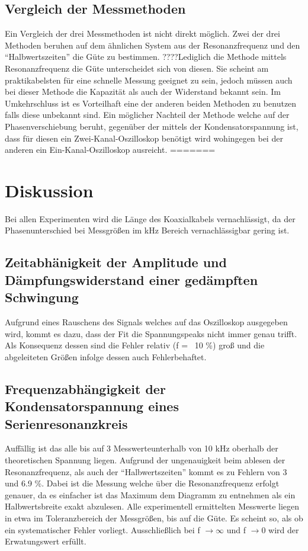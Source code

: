 \subsection{Vergleich der Messmethoden}
Ein Vergleich der drei Messmethoden ist nicht direkt möglich. Zwei der drei Methoden beruhen auf dem ähnlichen System aus der Resonanzfrequenz und den ``Halbwertszeiten'' die Güte zu bestimmen. ????Lediglich die Methode mittels Resonanzfrequenz die Güte unterscheidet sich von diesen. Sie scheint am praktikabelsten für eine schnelle Messung geeignet zu sein, jedoch müssen auch bei dieser Methode die Kapazität als auch der Widerstand bekannt sein. Im Umkehrschluss ist es Vorteilhaft eine der anderen beiden Methoden zu benutzen falls diese unbekannt sind. Ein möglicher Nachteil der Methode welche auf der Phasenverschiebung beruht, gegenüber der mittels der Kondensatorspannung ist, dass für diesen ein Zwei-Kanal-Oszilloskop benötigt wird wohingegen bei der anderen ein Ein-Kanal-Oszilloskop ausreicht.
=======
\section{Diskussion}
\label{sec:Diskussion}
Bei allen Experimenten wird die Länge des Koaxialkabels vernachlässigt, da der Phasenunterschied bei Messgrößen im kHz Bereich vernachlässigbar gering ist.
\subsection{Zeitabhänigkeit der Amplitude und Dämpfungswiderstand einer gedämpften Schwingung}
Aufgrund eines Rauschens des Signals welches auf das Oszilloskop ausgegeben wird, kommt es dazu, dass der Fit die Spannungspeaks nicht immer genau trifft. Als Konsequenz dessen sind die Fehler relativ (f =  ~10 \%) groß und die abgeleiteten Größen infolge dessen auch Fehlerbehaftet.
\subsection{Frequenzabhängigkeit der Kondensatorspannung eines
Serienresonanzkreis}
Auffällig ist das alle bis auf 3 Messwerteunterhalb von 10 kHz oberhalb der theoretischen Spannung liegen. Aufgrund der ungenauigkeit beim ablesen der Resonanzfrequenz, als auch der ``Halbwertszeiten'' kommt es zu Fehlern von 3 und 6.9 \%. Dabei ist die Messung welche über die Resonanzfrequenz erfolgt genauer, da es einfacher ist das Maximum dem Diagramm zu entnehmen als ein Halbwertsbreite exakt abzulesen.
Alle experimentell ermittelten Messwerte liegen in etwa im Toleranzbereich der Messgrößen, bis auf die Güte. Es scheint so, als ob ein systematischer Fehler vorliegt. Ausschließlich bei f $\rightarrow \infty $ und f $\rightarrow 0$ wird der Erwatungswert erfüllt.
